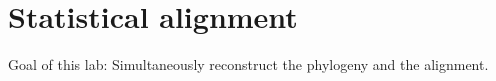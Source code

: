 \chapter{Statistical alignment}

Goal of this lab:
Simultaneously reconstruct the phylogeny and the alignment.

